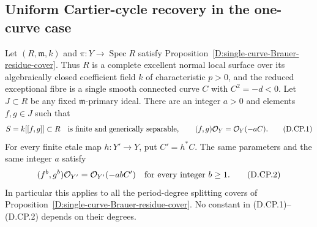 \subsection{Uniform Cartier-cycle recovery in the one-curve case}

\begin{proposition}
\label{D:single-curve-Cartier-parameter-ideal}
Let $(R,\mathfrak m,k)$ and $\pi:Y\to\operatorname{Spec}R$
satisfy Proposition~\ref{D:single-curve-Brauer-residue-cover}.
Thus $R$ is a complete excellent normal local surface over its
algebraically closed coefficient field $k$ of characteristic $p>0$,
and the reduced exceptional fibre is a single smooth connected
curve $C$ with $C^2=-d<0$.
Let $J\subset R$ be any fixed $\mathfrak m$-primary ideal.
There are an integer $a>0$ and elements $f,g\in J$ such that
\[
 S=k[[f,g]]\subset R\quad\hbox{is finite and generically separable},
 \qquad (f,g)\mathcal O_Y=\mathcal O_Y(-aC).
                                                        \tag{D.CP.1}
\]
For every finite etale map $h:Y'\to Y$, put $C'=h^*C$.
The same parameters and the same integer $a$ satisfy
\[
       (f^b,g^b)\mathcal O_{Y'}=\mathcal O_{Y'}(-abC')
                  \quad\hbox{for every integer }b\ge1.
                                                        \tag{D.CP.2}
\]
In particular this applies to all the period-degree splitting
covers of Proposition~\ref{D:single-curve-Brauer-residue-cover}.
No constant in (D.CP.1)--(D.CP.2) depends on their degrees.
\end{proposition}

